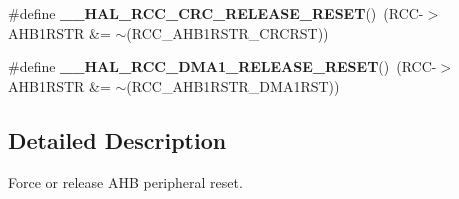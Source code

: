 \begin{DoxyCompactItemize}
\mbox{\label{group___r_c_c___peripheral___clock___force___release_gab7426b24c0b9d6aaec3c17f98735a178}} 
\#define {\bfseries \+\_\+\+\_\+\+H\+A\+L\+\_\+\+R\+C\+C\+\_\+\+C\+R\+C\+\_\+\+R\+E\+L\+E\+A\+S\+E\+\_\+\+R\+E\+S\+ET}()~(R\+CC-\/$>$A\+H\+B1\+R\+S\+TR \&= $\sim$(R\+C\+C\+\_\+\+A\+H\+B1\+R\+S\+T\+R\+\_\+\+C\+R\+C\+R\+ST))
\item 
\mbox{\label{group___r_c_c___peripheral___clock___force___release_ga8f7eef8316c35175df11d77f5106d334}} 
\#define {\bfseries \+\_\+\+\_\+\+H\+A\+L\+\_\+\+R\+C\+C\+\_\+\+D\+M\+A1\+\_\+\+R\+E\+L\+E\+A\+S\+E\+\_\+\+R\+E\+S\+ET}()~(R\+CC-\/$>$A\+H\+B1\+R\+S\+TR \&= $\sim$(R\+C\+C\+\_\+\+A\+H\+B1\+R\+S\+T\+R\+\_\+\+D\+M\+A1\+R\+ST))
\end{DoxyCompactItemize}


\subsection{Detailed Description}
Force or release A\+HB peripheral reset. 

